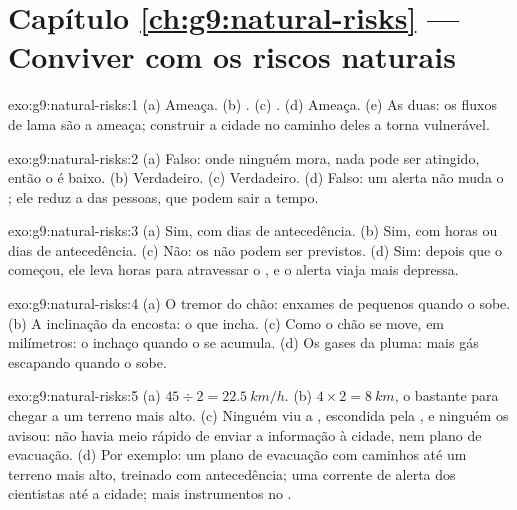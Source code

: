 \section*{Capítulo \ref{ch:g9:natural-risks} --- Conviver com os riscos naturais}

\begin{solution}{exo:g9:natural-risks:1}
(a) Ameaça. (b) . (c) . (d) Ameaça. (e) As
duas: os fluxos de lama são a ameaça; construir a cidade no caminho
deles a torna vulnerável.
\end{solution}

\begin{solution}{exo:g9:natural-risks:2}
(a) Falso: onde ninguém mora, nada pode ser atingido, então o  é
baixo. (b) Verdadeiro. (c) Verdadeiro. (d) Falso: um alerta não muda o
; ele reduz a  das pessoas, que podem sair a tempo.
\end{solution}

\begin{solution}{exo:g9:natural-risks:3}
(a) Sim, com dias de antecedência. (b) Sim, com horas ou dias de
antecedência. (c) Não: os  não podem ser previstos. (d) Sim:
depois que o  começou, ele leva horas para atravessar o , e
o alerta viaja mais depressa.
\end{solution}

\begin{solution}{exo:g9:natural-risks:4}
(a) O tremor do chão: enxames de pequenos  quando o  sobe.
(b) A inclinação da encosta: o  que incha. (c) Como o chão se move,
em milímetros: o inchaço quando o  se acumula. (d) Os gases da
pluma: mais gás escapando quando o  sobe.
\end{solution}

\begin{solution}{exo:g9:natural-risks:5}
(a) $45 \div 2 = \qty{22.5}{km/h}$. (b) $4 \times 2 = \qty{8}{km}$, o
bastante para chegar a um terreno mais alto. (c) Ninguém viu a ,
escondida pela , e ninguém os avisou: não havia meio rápido de
enviar a informação à cidade, nem plano de evacuação. (d) Por exemplo: um
plano de evacuação com caminhos até um terreno mais alto, treinado com
antecedência; uma corrente de alerta dos cientistas até a cidade; mais
instrumentos no .
\end{solution}

